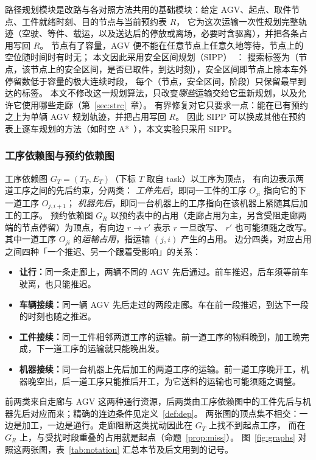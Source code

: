 \documentclass[manuscript,screen,review]{acmart}
\begin{document}
路径规划模块是改路与各对照方法共用的基础模块：给定 AGV、起点、取件节点、工件就绪时刻、目的节点与当前预约表 \(R\)，
它为这次运输一次性规划完整轨迹（空驶、等件、载运，以及送达后的停放或离场，必要时含驱离），并把各条占用写回 \(R\)。
节点有了容量，AGV 便不能在任意节点上任意久地等待，节点上的空位随时间时有时无；
本文因此采用安全区间规划（SIPP）~\cite{phillips2011sipp,kasaura2022sipp}：
搜索标签为（节点，该节点上的安全区间，是否已取件，到达时刻），安全区间即节点上除本车外停留数低于容量的极大连续时段，
每个（节点，安全区间，阶段）只保留最早到达的标签。
本文不修改这一规划算法，只改变\emph{哪些}运输交给它重新规划，以及允许它使用哪些走廊（第~\ref{sec:strc}~章）。
有界修复对它只要求一点：能在已有预约之上为单辆 AGV 规划轨迹，并把占用写回 \(R\)。
因此 SIPP 可以换成其他在预约表上逐车规划的方法（如时空 A*~\cite{silver2005cooperative}），本文实验只采用 SIPP。

\subsubsection{工序依赖图与预约依赖图}
\label{sec:two_graphs}

工序依赖图 \(G_T=(T_T,E_T)\)（下标 \(T\) 取自 task）以工序为顶点，
有向边表示两道工序之间的先后约束，分两类：
\emph{工件先后}，即同一工件的工序 \(O_{ji}\) 指向它的下一道工序 \(O_{j,i+1}\)；
\emph{机器先后}，即同一台机器上的工序指向在该机器上紧随其后加工的工序。
预约依赖图 \(G_R\) 以预约表中的占用（走廊占用为主，另含受阻走廊两端的节点停留）为顶点，有向边 \(r\to r'\) 表示 \(r\) 一旦改写、
\(r'\) 也可能须随之改写。其中一道工序 \(O_{ji}\) 的\emph{运输占用}，指运输 \((j,i)\) 产生的占用。
边分四类，对应占用之间四种「一个推迟、另一个跟着受影响」的关系：
\begin{itemize}[leftmargin=1.5em,itemsep=0.1em]
\item \textbf{让行：}同一条走廊上，两辆不同的 AGV 先后通过。前车推迟，后车须等前车驶离，也只能推迟。
\item \textbf{车辆接续：}同一辆 AGV 先后走过的两段走廊。车在前一段推迟，到达下一段的时刻也随之推迟。
\item \textbf{工件接续：}同一工件相邻两道工序的运输。前一道工序的物料晚到，加工晚完成，下一道工序的运输就只能晚出发。
\item \textbf{机器接续：}同一台机器上先后加工的两道工序的运输。前一道工序晚开工，机器晚空出，后一道工序只能推后开工，为它送料的运输也可能须随之调整。
\end{itemize}
前两类来自走廊与 AGV 这两种通行资源，后两类由工序依赖图中的工件先后与机器先后对应而来；精确的连边条件见定义~\ref{def:dep}。
两张图的顶点集不相交：一边是加工，一边是通行。走廊阻断这类扰动因此在 \(G_T\) 上找不到起点工序，
而在 \(G_R\) 上，与受扰时段重叠的占用就是起点（命题~\ref{prop:miss}）。
图~\ref{fig:graphs} 对照这两张图，表~\ref{tab:notation} 汇总本节及后文用到的记号。
\end{document}
